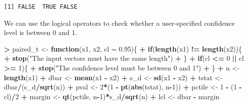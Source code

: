 \documentclass[]{krantz}
\makeatletter
\newenvironment{Shaded}{\begin{snugshade}}{\end{snugshade}}
\newcommand{\KeywordTok}[1]{\textcolor[rgb]{0.27,0.27,0.27}{\textbf{#1}}}
\newcommand{\DataTypeTok}[1]{\textcolor[rgb]{0.27,0.27,0.27}{#1}}
\newcommand{\DecValTok}[1]{\textcolor[rgb]{0.06,0.06,0.06}{#1}}
\newcommand{\FloatTok}[1]{\textcolor[rgb]{0.06,0.06,0.06}{#1}}
\newcommand{\StringTok}[1]{\textcolor[rgb]{0.5,0.5,0.5}{#1}}
\newcommand{\ControlFlowTok}[1]{\textcolor[rgb]{0.27,0.27,0.27}{\textbf{#1}}}
\newcommand{\OperatorTok}[1]{\textcolor[rgb]{0.43,0.43,0.43}{\textbf{#1}}}
\newcommand{\NormalTok}[1]{#1}
\newenvironment{kframe}{%
\medskip{}
\setlength{\fboxsep}{.8em}
 \def\at@end@of@kframe{}%
 \ifinner\ifhmode%
  \def\at@end@of@kframe{\end{minipage}}%
  \begin{minipage}{\columnwidth}%
 \fi\fi%
 \def\FrameCommand##1{\hskip\@totalleftmargin \hskip-\fboxsep
 \colorbox{shadecolor}{##1}\hskip-\fboxsep
     \hskip-\linewidth \hskip-\@totalleftmargin \hskip\columnwidth}%
 \MakeFramed {\advance\hsize-\width
   \@totalleftmargin\z@ \linewidth\hsize
   \@setminipage}}%
 {\par\unskip\endMakeFramed%
 \at@end@of@kframe}
\renewenvironment{Shaded}{\begin{kframe}}{\end{kframe}}
\makeatother
\begin{document}
\begin{verbatim}
[1] FALSE  TRUE FALSE
\end{verbatim}

We can use the logical operators to check whether a user-specified
confidence level is between 0 and 1.

\begin{Shaded}
\begin{Highlighting}[]
\OperatorTok{>}\StringTok{ }\NormalTok{paired_t <-}\StringTok{ }\ControlFlowTok{function}\NormalTok{(x1, x2, }\DataTypeTok{cl =} \FloatTok{0.95}\NormalTok{)\{}
\OperatorTok{+}\StringTok{     }\ControlFlowTok{if}\NormalTok{(}\KeywordTok{length}\NormalTok{(x1) }\OperatorTok{!=}\StringTok{ }\KeywordTok{length}\NormalTok{(x2))\{}
\OperatorTok{+}\StringTok{         }\KeywordTok{stop}\NormalTok{(}\StringTok{"The input vectors  must have the same length"}\NormalTok{)}
\OperatorTok{+}\StringTok{     }\NormalTok{\}}
\OperatorTok{+}\StringTok{     }\ControlFlowTok{if}\NormalTok{(cl }\OperatorTok{<=}\StringTok{ }\DecValTok{0} \OperatorTok{||}\StringTok{ }\NormalTok{cl }\OperatorTok{>=}\StringTok{ }\DecValTok{1}\NormalTok{)\{}
\OperatorTok{+}\StringTok{         }\KeywordTok{stop}\NormalTok{(}\StringTok{"The confidence level must be between 0 and 1"}\NormalTok{)}
\OperatorTok{+}\StringTok{     }\NormalTok{\}}
\OperatorTok{+}\StringTok{     }\NormalTok{n <-}\StringTok{ }\KeywordTok{length}\NormalTok{(x1)}
\OperatorTok{+}\StringTok{     }\NormalTok{dbar <-}\StringTok{ }\KeywordTok{mean}\NormalTok{(x1 }\OperatorTok{-}\StringTok{ }\NormalTok{x2)}
\OperatorTok{+}\StringTok{     }\NormalTok{s_d <-}\StringTok{ }\KeywordTok{sd}\NormalTok{(x1 }\OperatorTok{-}\StringTok{ }\NormalTok{x2)}
\OperatorTok{+}\StringTok{     }\NormalTok{tstat <-}\StringTok{ }\NormalTok{dbar}\OperatorTok{/}\NormalTok{(s_d}\OperatorTok{/}\KeywordTok{sqrt}\NormalTok{(n))}
\OperatorTok{+}\StringTok{     }\NormalTok{pval <-}\StringTok{ }\DecValTok{2}\OperatorTok{*}\NormalTok{(}\DecValTok{1} \OperatorTok{-}\StringTok{ }\KeywordTok{pt}\NormalTok{(}\KeywordTok{abs}\NormalTok{(tstat), n}\OperatorTok{-}\DecValTok{1}\NormalTok{))}
\OperatorTok{+}\StringTok{     }\NormalTok{pctile <-}\StringTok{ }\DecValTok{1} \OperatorTok{-}\StringTok{ }\NormalTok{(}\DecValTok{1} \OperatorTok{-}\StringTok{ }\NormalTok{cl)}\OperatorTok{/}\DecValTok{2}
\OperatorTok{+}\StringTok{     }\NormalTok{margin <-}\StringTok{ }\KeywordTok{qt}\NormalTok{(pctile, n}\OperatorTok{-}\DecValTok{1}\NormalTok{)}\OperatorTok{*}\NormalTok{s_d}\OperatorTok{/}\KeywordTok{sqrt}\NormalTok{(n)}
\OperatorTok{+}\StringTok{     }\NormalTok{lcl <-}\StringTok{ }\NormalTok{dbar }\OperatorTok{-}\StringTok{ }\NormalTok{margin}

\end{Highlighting}
\end{Shaded}
\end{document}
